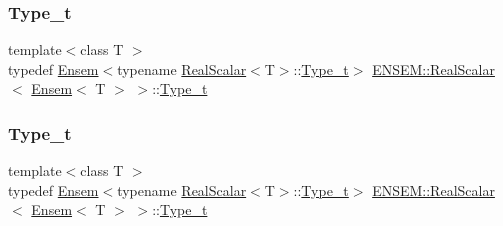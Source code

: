 \subsubsection{\texorpdfstring{Type\_t}{Type\_t}\hspace{0.1cm}{\footnotesize\ttfamily [1/3]}}
{\footnotesize\ttfamily template$<$class T $>$ \\
typedef \mbox{\hyperlink{classENSEM_1_1Ensem}{Ensem}}$<$typename \mbox{\hyperlink{structENSEM_1_1RealScalar}{Real\+Scalar}}$<$T$>$\+::\mbox{\hyperlink{structENSEM_1_1RealScalar_3_01Ensem_3_01T_01_4_01_4_a7822ecdfc2f8d6c24460263831283db8}{Type\+\_\+t}}$>$ \mbox{\hyperlink{structENSEM_1_1RealScalar}{E\+N\+S\+E\+M\+::\+Real\+Scalar}}$<$ \mbox{\hyperlink{classENSEM_1_1Ensem}{Ensem}}$<$ T $>$ $>$\+::\mbox{\hyperlink{structENSEM_1_1RealScalar_3_01Ensem_3_01T_01_4_01_4_a7822ecdfc2f8d6c24460263831283db8}{Type\+\_\+t}}}

\mbox{\label{structENSEM_1_1RealScalar_3_01Ensem_3_01T_01_4_01_4_a7822ecdfc2f8d6c24460263831283db8}} 
\subsubsection{\texorpdfstring{Type\_t}{Type\_t}\hspace{0.1cm}{\footnotesize\ttfamily [2/3]}}
{\footnotesize\ttfamily template$<$class T $>$ \\
typedef \mbox{\hyperlink{classENSEM_1_1Ensem}{Ensem}}$<$typename \mbox{\hyperlink{structENSEM_1_1RealScalar}{Real\+Scalar}}$<$T$>$\+::\mbox{\hyperlink{structENSEM_1_1RealScalar_3_01Ensem_3_01T_01_4_01_4_a7822ecdfc2f8d6c24460263831283db8}{Type\+\_\+t}}$>$ \mbox{\hyperlink{structENSEM_1_1RealScalar}{E\+N\+S\+E\+M\+::\+Real\+Scalar}}$<$ \mbox{\hyperlink{classENSEM_1_1Ensem}{Ensem}}$<$ T $>$ $>$\+::\mbox{\hyperlink{structENSEM_1_1RealScalar_3_01Ensem_3_01T_01_4_01_4_a7822ecdfc2f8d6c24460263831283db8}{Type\+\_\+t}}}

\mbox{\label{structENSEM_1_1RealScalar_3_01Ensem_3_01T_01_4_01_4_a7822ecdfc2f8d6c24460263831283db8}} 
